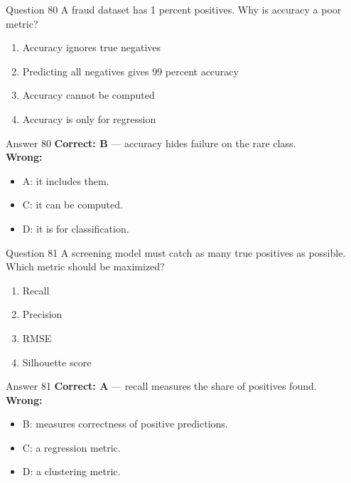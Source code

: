\documentclass[aspectratio=169,11pt]{beamer}
\begin{document}
	\begin{frame}{Question 80}
		A fraud dataset has 1 percent positives. Why is accuracy a poor metric?
		\begin{enumerate}[label=\Alph*.]
			\item Accuracy ignores true negatives
			\item Predicting all negatives gives 99 percent accuracy
			\item Accuracy cannot be computed
			\item Accuracy is only for regression
		\end{enumerate}
	\end{frame}
	\begin{frame}{Answer 80}
		\textbf{Correct: B} --- accuracy hides failure on the rare class.\\
		\vspace{0.5em}
		\textbf{Wrong:}
		\begin{itemize}
			\item A: it includes them.
			\item C: it can be computed.
			\item D: it is for classification.
		\end{itemize}
	\end{frame}
	
	\begin{frame}{Question 81}
		A screening model must catch as many true positives as possible. Which metric should be maximized?
		\begin{enumerate}[label=\Alph*.]
			\item Recall
			\item Precision
			\item RMSE
			\item Silhouette score
		\end{enumerate}
	\end{frame}
	\begin{frame}{Answer 81}
		\textbf{Correct: A} --- recall measures the share of positives found.\\
		\vspace{0.5em}
		\textbf{Wrong:}
		\begin{itemize}
			\item B: measures correctness of positive predictions.
			\item C: a regression metric.
			\item D: a clustering metric.
		\end{itemize}
	\end{frame}
	
\end{document}
